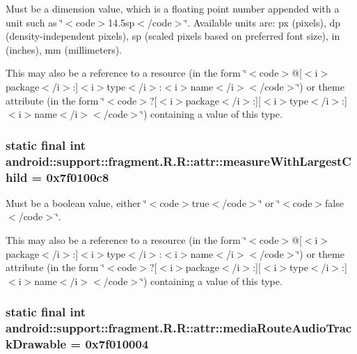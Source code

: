 Must be a dimension value, which is a floating point number appended with a unit such as \char`\"{}$<$code$>$14.5sp$<$/code$>$\char`\"{}. Available units are: px (pixels), dp (density-independent pixels), sp (scaled pixels based on preferred font size), in (inches), mm (millimeters). 

This may also be a reference to a resource (in the form \char`\"{}$<$code$>$@\mbox{[}$<$i$>$package$<$/i$>$:\mbox{]}$<$i$>$type$<$/i$>$:$<$i$>$name$<$/i$>$$<$/code$>$\char`\"{}) or theme attribute (in the form \char`\"{}$<$code$>$?\mbox{[}$<$i$>$package$<$/i$>$:\mbox{]}\mbox{[}$<$i$>$type$<$/i$>$:\mbox{]}$<$i$>$name$<$/i$>$$<$/code$>$\char`\"{}) containing a value of this type. \hypertarget{classandroid_1_1support_1_1fragment_1_1_r_1_1attr_4a219333501d5a2ebc56985be74329a6}{
\subsubsection[{measureWithLargestChild}]{\setlength{\rightskip}{0pt plus 5cm}static final int android::support::fragment.R.R::attr::measureWithLargestChild = 0x7f0100c8}}
\label{classandroid_1_1support_1_1fragment_1_1_r_1_1attr_4a219333501d5a2ebc56985be74329a6}


Must be a boolean value, either \char`\"{}$<$code$>$true$<$/code$>$\char`\"{} or \char`\"{}$<$code$>$false$<$/code$>$\char`\"{}. 

This may also be a reference to a resource (in the form \char`\"{}$<$code$>$@\mbox{[}$<$i$>$package$<$/i$>$:\mbox{]}$<$i$>$type$<$/i$>$:$<$i$>$name$<$/i$>$$<$/code$>$\char`\"{}) or theme attribute (in the form \char`\"{}$<$code$>$?\mbox{[}$<$i$>$package$<$/i$>$:\mbox{]}\mbox{[}$<$i$>$type$<$/i$>$:\mbox{]}$<$i$>$name$<$/i$>$$<$/code$>$\char`\"{}) containing a value of this type. \hypertarget{classandroid_1_1support_1_1fragment_1_1_r_1_1attr_390bcc63a3b5aa2b6ae425170705b5f6}{
\subsubsection[{mediaRouteAudioTrackDrawable}]{\setlength{\rightskip}{0pt plus 5cm}static final int android::support::fragment.R.R::attr::mediaRouteAudioTrackDrawable = 0x7f010004}}
\label{classandroid_1_1support_1_1fragment_1_1_r_1_1attr_390bcc63a3b5aa2b6ae425170705b5f6}


